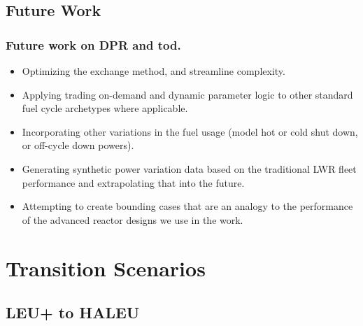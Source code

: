 \documentclass[9pt]{beamer}
\begin{document}
\subsection{Future Work}
\begin{frame}
  \frametitle{Future work on DPR and \gls{tod}.}
  \begin{itemize}[<+->]
    \item Optimizing the exchange method, and streamline complexity.
    \item Applying trading on-demand and dynamic parameter logic to other standard fuel cycle archetypes where applicable.
    \item Incorporating other variations in the fuel usage (model hot or cold shut down, or off-cycle down powers).
    \item Generating synthetic power variation data based on the traditional LWR fleet performance and extrapolating that into the future.
    \item Attempting to create bounding cases that are an analogy to the performance of the advanced reactor designs we use in the work.
  \end{itemize}
\end{frame}

\section{Transition Scenarios}
  \subsection{LEU+ to HALEU}
\end{document}
